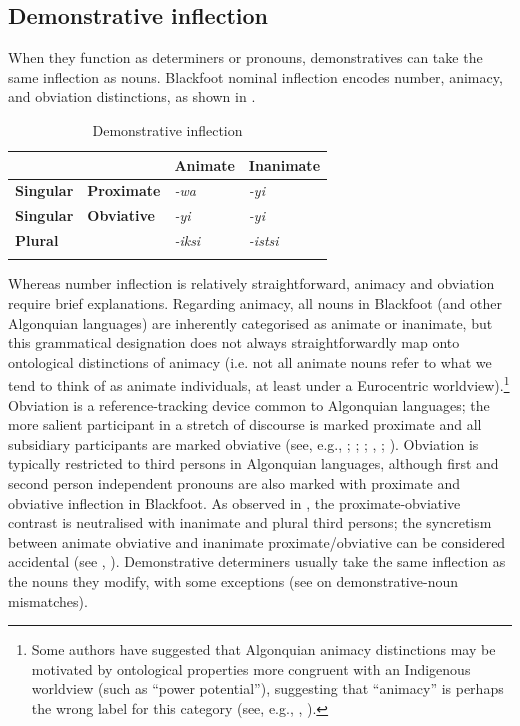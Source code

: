 \documentclass[output=paper,colorlinks,citecolor=brown]{langscibook}
\begin{document}
\subsection{Demonstrative inflection}\label{sec:bliss:4.3}

When they function as determiners or pronouns, demonstratives can take the same inflection as nouns. Blackfoot nominal inflection encodes number, animacy, and obviation distinctions, as shown in .

\begin{table}
\begin{tabularx}{.8\textwidth}{XXXl}
\lsptoprule
&  & \textbf{Animate} & \textbf{Inanimate}\\
\midrule
\textbf{Singular} & \textbf{Proximate} & \textit{-wa} & \textit{-yi}\\
\textbf{Singular} & \textbf{Obviative} & \textit{-yi} & \textit{-yi}\\
\textbf{Plural} & {} & \textit{-iksi} & \textit{-istsi}\\
\lspbottomrule
\end{tabularx}
\caption{Demonstrative inflection}
\label{tab:bliss:2}
\end{table}

Whereas number inflection is relatively straightforward, animacy and obviation require brief explanations. Regarding animacy, all nouns in Blackfoot (and other Algonquian languages) are inherently categorised as animate or inanimate, but this grammatical designation does not always straightforwardly map onto ontological distinctions of animacy (i.e. not all animate nouns refer to what we tend to think of as animate individuals, at least under a Eurocentric worldview).\footnote{Some authors have suggested that Algonquian animacy distinctions may be motivated by ontological properties more congruent with an Indigenous worldview (such as “power potential”), suggesting that “animacy” is perhaps the wrong label for this category (see, e.g., \citealt{Dahlstrom1995}, \citealt{Goddard2002}).} Obviation is a reference-tracking device common to Algonquian languages; the more salient participant in a stretch of discourse is marked proximate and all subsidiary participants are marked obviative (see, e.g., \citealt{Bliss2017Dependencies}; \citealt{Dahlstrom1991}; \citealt{Genee2009}; \citealt{Goddard1984}, \citeyear{Goddard1990}; \citealt{Junker2004}). Obviation is typically restricted to third persons in Algonquian languages, although first and second person independent pronouns are also marked with proximate and obviative inflection in Blackfoot. As observed in , the proximate-obviative contrast is neutralised with inanimate and plural third persons; the syncretism between animate obviative and inanimate proximate/obviative can be considered accidental (see \citealt{BlissOxford2016}, \citeyear{BlissOxford2017}). Demonstrative determiners usually take the same inflection as the nouns they modify, with some exceptions (see \citealt{Bliss2017Demonstratives} on demonstrative-noun mismatches).
\end{document}

